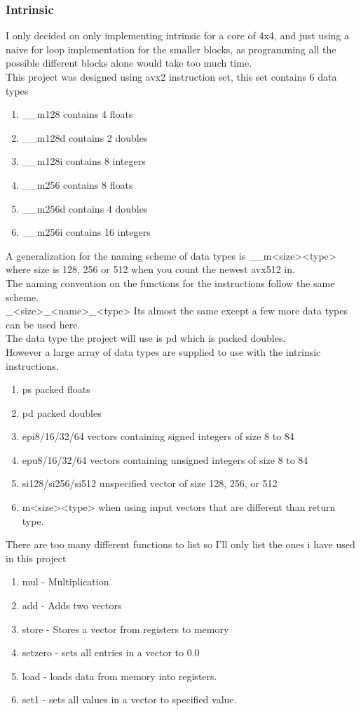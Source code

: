 \documentclass[a4paper,10pt,titlepage]{report}
\begin{document}
\subsubsection{Intrinsic}
I only decided on only implementing intrinsic for a core of 4x4, and just using a naive for loop implementation for the smaller blocks, as programming all the possible different blocks alone would take too much time.\\ 
\vspace{5mm}
This project was designed using avx2 instruction set, this set contains 6 data types
\begin{enumerate}
\item \_\_m128  contains 4 floats
\item \_\_m128d contains 2 doubles
\item \_\_m128i contains 8 integers
\item \_\_m256 contains 8 floats
\item \_\_m256d contains 4 doubles
\item \_\_m256i contains 16 integers
\end{enumerate}
A generalization for the naming scheme of data types is \_\_m<size><type> where size is 128, 256 or 512 when you count the newest avx512 in.
\\ \vspace{5mm}
The naming convention on the functions for the instructions follow the same scheme.
\\
\_<size>\_<name>\_<type>
Its almost the same except a few more data types can be used here. \\
The data type the project will use is pd which is packed doubles. \\
However a large array of data types are supplied to use with the intrinsic instructions.
\begin{enumerate}
\item ps  packed floats
\item pd  packed doubles
\item epi8/16/32/64 vectors containing signed integers of size 8 to 84
\item epu8/16/32/64 vectors containing unsigned integers of size 8 to 84
\item si128/si256/si512 unspecified vector of size 128, 256, or 512
\item m<size><type> when using input vectors that are different than return type.
\end{enumerate}

There are too many different functions to list so I'll only list the ones i have used in this project\\
\begin{enumerate}
\item mul - Multiplication
\item add - Adds two vectors
\item store - Stores a vector from registers to memory
\item setzero - sets all entries in a vector to 0.0
\item load - loads data from memory into registers.
\item set1 - sets all values in a vector to specified value.
\end{enumerate}
\newpage
\end{document}
